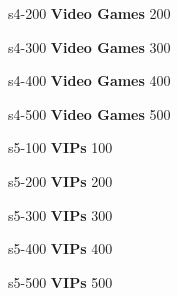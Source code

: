 \documentclass{beamer}
\def \fourthcat {\textbf{Video Games}}
\def \fifthcat {\textbf{VIPs}}
\begin{document}
	\content
	{s4-200}
	{\fourthcat}
	{200}{
    \db
	}


	\content
	{s4-300}
	{\fourthcat}
	{300}{
    \dc
	}


	\content
	{s4-400}
	{\fourthcat}
	{400}{
    \dd
	}


	\content
	{s4-500}
	{\fourthcat}
	{500}{
    \de
	}


	\content
	{s5-100}
	{\fifthcat}
	{100}{
    \ea
	}


	\content
	{s5-200}
	{\fifthcat}
	{200}{
    \eb
	}


	\content
	{s5-300}
	{\fifthcat}
	{300}{
    \ec
	}


	\contentdouble
	{s5-400}
	{\fifthcat}
	{400}{
    \ed
	}


	\content
	{s5-500}
	{\fifthcat}
	{500}{
    \ee
	}
\end{document}
